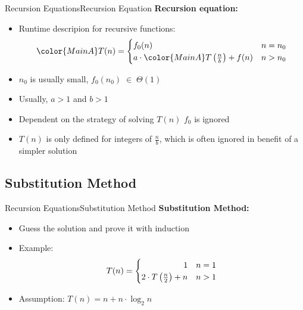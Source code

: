 \begin{frame}{Recursion Equations}{Recursion Equation}
  \textbf{Recursion equation:}
  \begin{itemize}
    \item<2->
    Runtime descripion for recursive functions:
    \begin{displaymath}
    {\color{MainA}T(n)} = \begin{cases}
      f_0(n) & n = n_0\\
      a \cdot {\color{MainA}T\left(\frac{n}{b}\right)} + f(n) & n > n_0
    \end{cases}
    \end{displaymath}
    \item<3->
      {\color{MainA}$n_0$} is usually small, {\color{MainA}$f_0(n_0) \; \in \; \Theta(1)$}
    \item<4->
      Usually, {\color{MainA}$a > 1$} and {\color{MainA}$b > 1$}
    \item<5->
      Dependent on the strategy of solving {\color{MainA}$T(n)$}
      {\color{MainA}$f_0$} is ignored
    \item<6->
      {\color{MainA}$T(n)$} is only defined for integers of
      {\color{MainA}$\frac{n}{b}$}, which is often ignored in benefit of
      a simpler solution
  \end{itemize}
\end{frame}


\subsection{Substitution Method}

\begin{frame}{Recursion Equations}{Substitution Method}
  \textbf{Substitution Method:}
  \begin{itemize}
    \item<2->
      Guess the solution and prove it with induction
    \item<3->
      Example:        \color{MainA}
      \begin{displaymath}
        T(n) = \begin{cases}
          \hfill 1 & n = 1\\
          2 \cdot T\left(\frac{n}{2}\right) + n & n > 1
        \end{cases}
      \end{displaymath}        \color{black}
    \item<4->
      Assumption:  {\color{MainA}$T(n) = n + n \cdot \log_2 n$}
  \end{itemize}
\end{frame}

